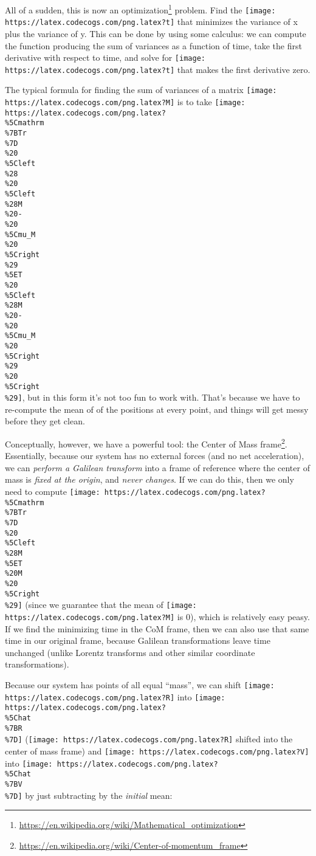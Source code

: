 \documentclass[]{article}
\renewcommand{\href}[2]{#2\footnote{\url{#1}}}
\begin{document}
All of a sudden, this is now an
\href{https://en.wikipedia.org/wiki/Mathematical_optimization}{optimization}
problem. Find the \texttt{[image: https://latex.codecogs.com/png.latex?t]} that
minimizes the variance of x plus the variance of y. This can be done by using
some calculus: we can compute the function producing the sum of variances as a
function of time, take the first derivative with respect to time, and solve for
\texttt{[image: https://latex.codecogs.com/png.latex?t]} that makes the first
derivative zero.

The typical formula for finding the sum of variances of a matrix
\texttt{[image: https://latex.codecogs.com/png.latex?M]} is to take
\texttt{[image: https://latex.codecogs.com/png.latex?\\\%5Cmathrm\\\%7BTr\\\%7D\\\%20\\\%5Cleft\\\%28\\\%20\\\%5Cleft\\\%28M\\\%20-\\\%20\\\%5Cmu\_M\\\%20\\\%5Cright\\\%29\\\%5ET\\\%20\\\%5Cleft\\\%28M\\\%20-\\\%20\\\%5Cmu\_M\\\%20\\\%5Cright\\\%29\\\%20\\\%5Cright\\\%29]},
but in this form it's not too fun to work with. That's because we have to
re-compute the mean of of the positions at every point, and things will get
messy before they get clean.

Conceptually, however, we have a powerful tool: the
\href{https://en.wikipedia.org/wiki/Center-of-momentum_frame}{Center of Mass
frame}. Essentially, because our system has no external forces (and no net
acceleration), we can \emph{perform a Galilean transform} into a frame of
reference where the center of mass is \emph{fixed at the origin}, and
\emph{never changes}. If we can do this, then we only need to compute
\texttt{[image: https://latex.codecogs.com/png.latex?\\\%5Cmathrm\\\%7BTr\\\%7D\\\%20\\\%5Cleft\\\%28M\\\%5ET\\\%20M\\\%20\\\%5Cright\\\%29]}
(since we guarantee that the mean of
\texttt{[image: https://latex.codecogs.com/png.latex?M]} is 0), which is
relatively easy peasy. If we find the minimizing time in the CoM frame, then we
can also use that same time in our original frame, because Galilean
transformations leave time unchanged (unlike Lorentz transforms and other
similar coordinate transformations).

Because our system has points of all equal ``mass'', we can shift
\texttt{[image: https://latex.codecogs.com/png.latex?R]} into
\texttt{[image: https://latex.codecogs.com/png.latex?\\\%5Chat\\\%7BR\\\%7D]}
(\texttt{[image: https://latex.codecogs.com/png.latex?R]} shifted into the
center of mass frame) and
\texttt{[image: https://latex.codecogs.com/png.latex?V]} into
\texttt{[image: https://latex.codecogs.com/png.latex?\\\%5Chat\\\%7BV\\\%7D]} by just
subtracting by the \emph{initial} mean:
\end{document}
